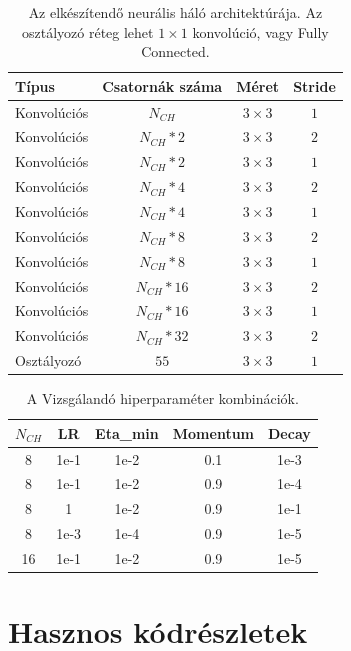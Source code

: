 \documentclass[12pt,a4paper,oneside]{report}             %
\begin{document}
\begin{table}[!htb]
	\label{tab:1}
	\centering
	\begin{tabular}{| l | c | c | c |}
		\hline
		\textbf{Típus} & \textbf{Csatornák száma} & \textbf{Méret} & \textbf{Stride} \\ \hline \hline
		Konvolúciós & $N_{CH}$ & $3\times 3$ & $1$ \\ \hline
		Konvolúciós & $N_{CH}*2$ & $3\times 3$ & $2$ \\ \hline
		Konvolúciós & $N_{CH}*2$ & $3\times 3$ & $1$ \\ \hline
		Konvolúciós & $N_{CH}*4$ & $3\times 3$ & $2$ \\ \hline
		Konvolúciós & $N_{CH}*4$ & $3\times 3$ & $1$ \\ \hline
		Konvolúciós & $N_{CH}*8$ & $3\times 3$ & $2$ \\ \hline
		Konvolúciós & $N_{CH}*8$ & $3\times 3$ & $1$ \\ \hline
		Konvolúciós & $N_{CH}*16$ & $3\times 3$ & $2$ \\ \hline
		Konvolúciós & $N_{CH}*16$ & $3\times 3$ & $1$ \\ \hline
		Konvolúciós & $N_{CH}*32$ & $3\times 3$ & $2$ \\ \hline
		Osztályozó & $55$ & $3\times 3$ & $1$ \\ \hline
	\end{tabular}
\caption{Az elkészítendő neurális háló architektúrája. Az osztályozó réteg lehet $1\times 1$ konvolúció, vagy Fully Connected.}
\end{table}

\begin{table}[!htb]
\label{tab:2}
\centering
\begin{tabular}{| c | c | c | c | c |}
	\hline
	$N_{CH}$ & \textbf{LR} & \textbf{Eta\_min} & \textbf{Momentum} & \textbf{Decay} \\ \hline \hline
	8 & 1e-1 & 1e-2 & 0.1 & 1e-3 \\ \hline
	8 & 1e-1 & 1e-2 & 0.9 & 1e-4  \\ \hline
	8 & 1 & 1e-2 & 0.9 & 1e-1  \\ \hline
	8 & 1e-3 & 1e-4 & 0.9 & 1e-5  \\ \hline
	16 & 1e-1& 1e-2 & 0.9 & 1e-5  \\ \hline
\end{tabular}
\caption{A Vizsgálandó hiperparaméter kombinációk.}
\end{table}

\chapter{Hasznos kódrészletek}
\end{document}

